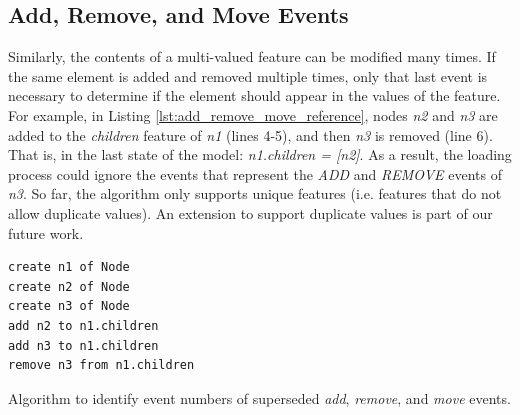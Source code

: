 \documentclass[12pt, a4paper]{report} \usepackage[titletoc]{appendix}
\begin{document}
\subsection{Add, Remove, and Move Events}\label{subsec:add_remove_and_move_operations}
Similarly, the contents of a multi-valued feature can be modified many times. If the same element is added and removed multiple times,  only that last event is necessary to determine if the element should appear in the values of the feature. For example, in Listing \ref{lst:add_remove_move_reference},  nodes \emph{n2} and \emph{n3} are added to the \emph{children} feature of \emph{n1} (lines 4-5), and then \emph{n3} is removed (line 6). That is, in the last state of the model: \emph{n1.children = [n2]}. As a result, the loading process could ignore the events that represent the \emph{ADD} and \emph{REMOVE} events of \emph{n3}. So far, the algorithm only supports unique features (i.e. features that do not allow duplicate values). An extension to support duplicate values is part of our future work. 

\begin{lstlisting}[style=eol,caption={Example of CBP representation of attribute \emph{values}'s add and remove operations.},label=lst:add_remove_move_reference]
create n1 of Node
create n2 of Node
create n3 of Node
add n2 to n1.children
add n3 to n1.children
remove n3 from n1.children
\end{lstlisting}

\begin{algorithm}[H]
	\begin{small}
	\end{small}
	\caption{Algorithm to identify event numbers of superseded \emph{add}, \emph{remove}, and \emph{move} events.}
	\label{alg:add_remove_move_optimisation}
\end{algorithm}
\end{document}
